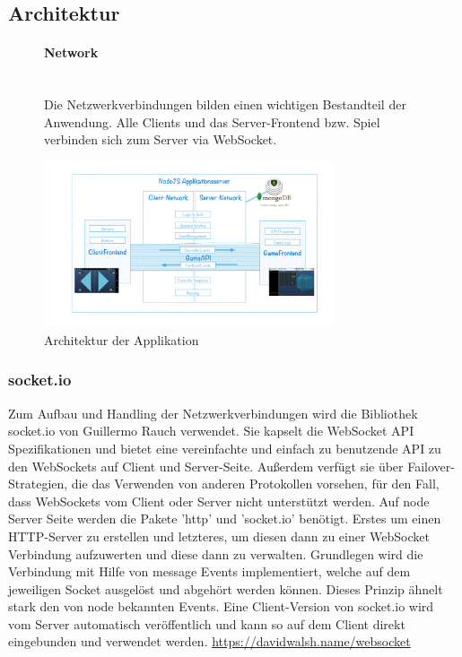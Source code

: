 \documentclass[a4paper]{spie}  %
\begin{document}
\subsection{Architektur}
\begin{figure}[H]
	\begin{minipage}[t]{0.4\textwidth}
		\vspace{0pt}
		\paragraph{Network}\mbox{}\\
		Die Netzwerkverbindungen bilden einen wichtigen Bestandteil der Anwendung. Alle Clients und das Server-Frontend bzw. Spiel verbinden sich zum Server via WebSocket.
	\end{minipage}
	\hfill
	\begin{minipage}[t]{0.5\textwidth}
		\vspace{0pt}
		\includegraphics[width=8.5cm]{images/arch/M113.png}
		\caption{Architektur der Applikation}
		\label{fig:test2}
	\end{minipage}
\end{figure}



\subsubsection{socket.io} %
Zum Aufbau und Handling der Netzwerkverbindungen wird die Bibliothek socket.io von Guillermo Rauch verwendet. Sie kapselt die WebSocket API Spezifikationen und bietet eine vereinfachte und einfach zu benutzende API zu den WebSockets auf Client und Server-Seite. Außerdem verfügt sie über Failover-Strategien, die das Verwenden von anderen Protokollen vorsehen, für den Fall, dass WebSockets vom Client oder Server nicht unterstützt werden.
Auf node Server Seite werden die Pakete 'http' und 'socket.io' benötigt. Erstes um einen HTTP-Server zu erstellen und letzteres, um diesen dann zu einer WebSocket Verbindung aufzuwerten und diese dann zu verwalten. Grundlegen wird die Verbindung mit Hilfe von message Events implementiert, welche auf dem jeweiligen Socket ausgelöst und abgehört werden können. Dieses Prinzip ähnelt stark den von node bekannten Events. Eine Client-Version von socket.io wird vom Server automatisch veröffentlich und kann so auf dem Client direkt eingebunden und verwendet werden.
\url{https://davidwalsh.name/websocket}
\end{document}
